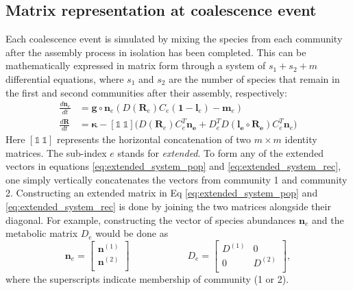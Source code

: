 \documentclass[12pt]{article}
\begin{document}
\subsection*{Matrix representation at coalescence event}
Each coalescence event is simulated by mixing the species from each community after the assembly process in isolation has been completed. This can be mathematically expressed in matrix form through a system of $ s_1 + s_2 + m $ differential equations, where $ s_1 $ and $ s_2 $ are the number of species that remain in the first and second communities after their assembly, respectively: 
\begin{align}
	\frac{d\boldsymbol{n}_e}{dt} &= \boldsymbol{g}\circ \boldsymbol{n}_{e}\left(D(\boldsymbol{R}_e)C_{e}(\boldsymbol{1}-\boldsymbol{l}_e) - \boldsymbol{m}_e\right) \label{eq:extended_system_pop} \\ 
	\frac{d\boldsymbol{R}}{dt} &= \boldsymbol{\kappa} - \left[\mathbb{1} \ \mathbb{1}\right] \Big( D(\boldsymbol{R}_e)C_e^T\boldsymbol{n_e} +  D_e^TD(\boldsymbol{l_e}\circ \boldsymbol{R_e})C_e^T\boldsymbol{n}_e\Big) \label{eq:extended_system_rec}
\end{align}
Here $ \left[\mathbb{1} \ \mathbb{1}\right] $ represents the horizontal concatenation of two $m \times m$ identity matrices. The sub-index $e$ stands for \textit{extended}. To form any of the extended vectors in equations \ref{eq:extended_system_pop} and \ref{eq:extended_system_rec}, one simply vertically concatenates the vectors from community 1 and community 2. Constructing an extended matrix in Eq \ref{eq:extended_system_pop} and \ref{eq:extended_system_rec} is done by joining the two matrices alongside their diagonal. For example, constructing the vector of species abundances $\boldsymbol{n}_e$ and the metabolic matrix $D_e$ would be done as
\begin{equation*}
    \boldsymbol{n}_e = \begin{bmatrix}
                            \boldsymbol{n}^{(1)} \\
                            \boldsymbol{n}^{(2)} \\
                        \end{bmatrix} 
    \qquad \qquad \qquad 
    D_e = \begin{bmatrix}
                D^{(1)} & 0 \\
                0 & D^{(2)} \\ 
          \end{bmatrix},
\end{equation*}
where the superscripts indicate membership of community (1 or 2).



\newpage



\end{document}
